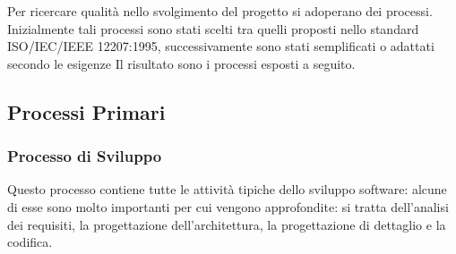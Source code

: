 Per ricercare qualità nello svolgimento del progetto si adoperano dei processi. Inizialmente tali processi sono stati scelti tra quelli proposti nello standard ISO/IEC/IEEE 12207:1995,
successivamente sono stati semplificati o adattati secondo le esigenze
Il risultato sono i processi esposti a seguito.
\subsection{Processi Primari}
    \subsubsection{Processo di Sviluppo}
        Questo processo contiene tutte le attività tipiche dello sviluppo software: alcune di esse sono molto importanti per cui vengono approfondite: si tratta dell'analisi dei requisiti,
        la progettazione dell'architettura, la progettazione di dettaglio e la codifica.
